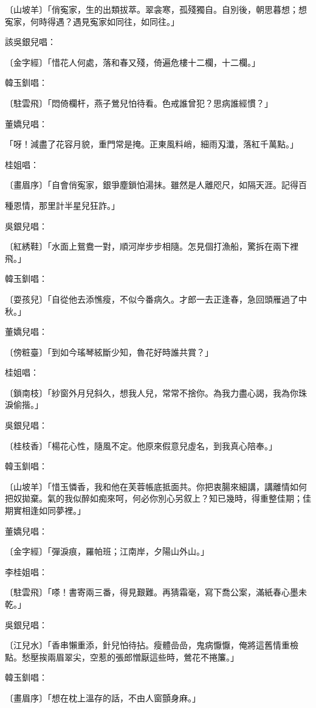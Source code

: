 〔山坡羊〕「俏寃家，生的出類拔萃。翠衾寒，孤殘獨自。自別後，朝思暮想；想寃家，何時得遇？遇見寃家如同往，如同往。」

該吳銀兒唱：

〔金字經〕「惜花人何處，落和春又殘，倚遍危樓十二欄，十二欄。」

韓玉釧唱：

〔駐雲飛〕「悶倚欄杆，燕子鶯兒怕待看。色戒誰曾犯？思病誰經慣？」

董嬌兒唱：

「呀！減盡了花容月貌，重門常是掩。正東風料峭，細雨刄瀸，落紅千萬點。」

桂姐唱：

〔畫眉序〕「自會俏寃家，銀爭塵鎖怕湯抹。雖然是人離咫尺，如隔天涯。記得百

種恩情，那里計半星兒狂詐。」

吳銀兒唱：

〔紅綉鞋〕「水面上鴛鴦一對，順河岸步步相隨。怎見個打漁船，驚拆在兩下裡飛。」

韓玉釧唱：

〔耍孩兒〕「自從他去添憔瘦，不似今番病久。才郎一去正逢春，急回頭雁過了中秋。」

董嬌兒唱：

〔傍粧臺〕「到如今瑤琴絃斷少知，魯花好時誰共賞？」

桂姐唱：

〔鎖南枝〕「紗窗外月兒斜久，想我人兒，常常不捨你。為我力盡心謁，我為你珠淚偷揩。」

吳銀兒唱：

〔桂枝香〕「楊花心性，隨風不定。他原來假意兒虛名，到我真心陪奉。」

韓玉釧唱：

〔山坡羊〕「惜玉憐香，我和他在芙蓉帳底抵面共。你把衷腸來細講，講離情如何把奴拋棄。氣的我似醉如痴來呵，何必你別心另叙上？知已幾時，得重整佳期；佳期實相逢如同夢裡。」

董嬌兒唱：

〔金字經〕「彈淚痕，羅帕班；江南岸，夕陽山外山。」

李桂姐唱：

〔駐雲飛〕「嗏！書寄兩三番，得見艱難。再猜霜毫，寫下喬公案，滿紙春心墨未乾。」

吳銀兒唱：

〔江兒水〕「香串懶重添，針兒怕待拈。瘦體嵒嵒，鬼病懨懨，俺將這舊情重檢點。愁壓挨兩眉翠尖，空惹的張郎憎厭這些時，鶯花不捲簾。」

韓玉釧唱：

〔畫眉序〕「想在枕上溫存的話，不由人窗顫身麻。」

